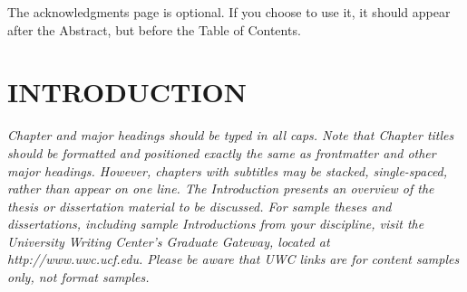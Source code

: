 \documentclass{UCF_ETD}
\begin{document}
\begin{acknowledgments}
The acknowledgments page is optional. If you choose to use it, it should appear after the Abstract, but before the Table of Contents.
\end{acknowledgments}

\tableofcontents

\listoffigures

\listoftables

\mainmatter

\chapter{INTRODUCTION} 
\textit{Chapter and major headings should be typed in all caps.  Note that Chapter titles should be formatted and positioned exactly the same as frontmatter and other major headings. However, chapters with subtitles may be stacked, single-spaced, rather than appear on one line.
The Introduction presents an overview of the thesis or dissertation material to be discussed. For sample theses and dissertations, including sample Introductions from your discipline, visit the University Writing Center’s Graduate Gateway, located at http://www.uwc.ucf.edu. Please be aware that UWC links are for content samples only, not format samples.
}

\end{document}
